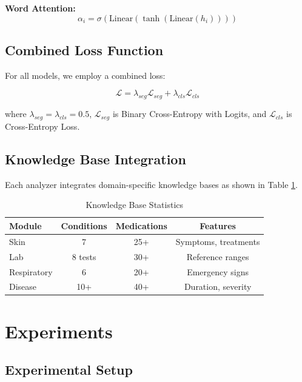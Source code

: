 \documentclass[conference]{IEEEtran}
\begin{document}
\textbf{Word Attention:}
\begin{equation}
\alpha_i = \sigma(\text{Linear}(\tanh(\text{Linear}(h_i))))
\end{equation}

\subsection{Combined Loss Function}

For all models, we employ a combined loss:

\begin{equation}
\mathcal{L} = \lambda_{seg} \mathcal{L}_{seg} + \lambda_{cls} \mathcal{L}_{cls}
\end{equation}

where $\lambda_{seg} = \lambda_{cls} = 0.5$, $\mathcal{L}_{seg}$ is Binary Cross-Entropy with Logits, and $\mathcal{L}_{cls}$ is Cross-Entropy Loss.

\subsection{Knowledge Base Integration}

Each analyzer integrates domain-specific knowledge bases as shown in Table \ref{tab:knowledge}.

\begin{table}[H]
\centering
\caption{Knowledge Base Statistics}
\label{tab:knowledge}
\begin{tabular}{|l|c|c|c|}
\hline
\textbf{Module} & \textbf{Conditions} & \textbf{Medications} & \textbf{Features} \\
\hline
Skin & 7 & 25+ & Symptoms, treatments \\
Lab & 8 tests & 30+ & Reference ranges \\
Respiratory & 6 & 20+ & Emergency signs \\
Disease & 10+ & 40+ & Duration, severity \\
\hline
\end{tabular}
\end{table}

\section{Experiments}

\subsection{Experimental Setup}
\end{document}

